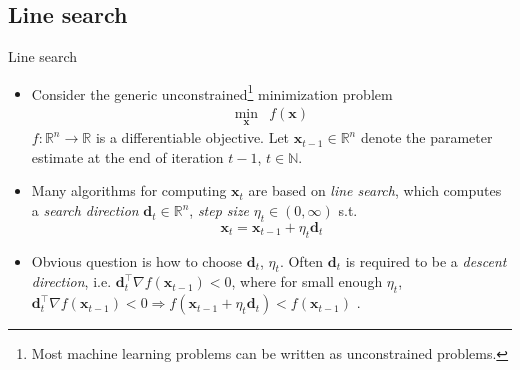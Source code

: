 \documentclass{beamer}
\numberwithin{equation}{section}
\begin{document}
\subsection{Line search}

\begin{frame}{Line search}
    \begin{itemize}
        \item
        Consider the generic unconstrained\footnote{
            Most machine learning problems can be written as unconstrained
            problems.
        } minimization problem
        \begin{equation} \label{eq:unconstrained_min}
            \begin{array}{ll}
                \displaystyle\min_\mathbf{x} & f(\mathbf{x})
            \end{array}
        \end{equation}
        $ f : \mathbb{R}^n \rightarrow \mathbb{R} $ is a differentiable
        objective. Let $ \mathbf{x}_{t - 1} \in \mathbb{R}^n $ denote the
        parameter estimate at the end of iteration $ t - 1 $,
        $ t \in \mathbb{N} $.

        \item
        Many algorithms for computing $ \mathbf{x}_t $ are based on
        \textit{line search}, which computes a \textit{search direction}
        $ \mathbf{d}_t \in \mathbb{R}^n $, \textit{step size}
        $ \eta_t \in (0, \infty) $ s.t. \cite{nocedal_opt}
        \begin{equation} \label{eq:line_search_eq}
            \mathbf{x}_t = \mathbf{x}_{t - 1} + \eta_t\mathbf{d}_t
        \end{equation}

        \item
        Obvious question is how to choose $ \mathbf{d}_t $, $ \eta_t $. Often
        $ \mathbf{d}_t $ is required to be a \textit{descent direction}, i.e.
        $ \mathbf{d}_t^\top\nabla f(\mathbf{x}_{t - 1}) < 0 $, where for small
        enough $ \eta_t $, $ \mathbf{d}_t^\top\nabla f(\mathbf{x}_{t - 1}) < 0
        \Rightarrow f(\mathbf{x}_{t - 1} + \eta_t\mathbf{d}_t) <
        f(\mathbf{x}_{t - 1}) $ \cite{nocedal_opt}.
    \end{itemize}

    \medskip
\end{frame}
\end{document}

